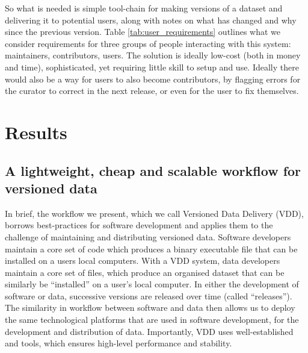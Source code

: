 \documentclass[a4paper,11pt]{article}
\begin{document}
So what is needed is simple tool-chain for
making versions of a dataset and delivering it to potential users, along
with notes on what has changed and why since the previous version.
Table \ref{tab:user_requirements} outlines what we consider requirements for
three groups of people interacting with this system: maintainers,
contributors, users. The solution is ideally low-cost (both in money and
time), sophisticated, yet requiring little skill to setup and use.  Ideally
there would also be a way for users to also become contributors, by flagging
errors for the curator to correct in the next release, or even for the user to
fix themselves.


\section{Results}

\subsection{A lightweight, cheap and scalable workflow for versioned data}


In brief, the workflow we present, which we call Versioned Data Delivery (VDD), borrows best-practices for software development and applies them to the challenge of maintaining and distributing versioned data. Software developers maintain a core set of code which produces a binary executable file that can be installed on a users local  computers. With a VDD system, data developers maintain a core set of files, which produce an organised dataset that can be similarly be ``installed'' on a user's local computer. In either the development of software or data, successive versions are released over time (called ``releases''). The similarity in workflow between software and data then allows us to deploy the same technological platforms that are used in software development, for the development and distribution of data. Importantly, VDD uses well-established and tools, which ensures high-level performance and stability.
\end{document}

